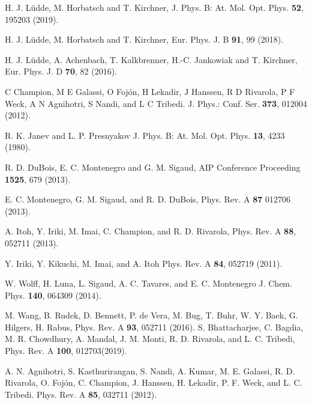\documentclass[10pt,showpacs,showkeys,twocolumn]{revtex4}
\begin{document}
\begin{thebibliography}{}
H. J. L\"udde,  M. Horbatsch and T. Kirchner, J. Phys. B: At. Mol. Opt. Phys.  \textbf{52}, 195203 (2019).

H. J. L\"udde, M. Horbatsch and T. Kirchner, Eur. Phys. J. B \textbf{91}, 99 (2018).

H. J. L\"udde, A. Achenbach, T. Kalkbrenner, H.-C. Jankowiak and T. Kirchner,
Eur. Phys. J. D \textbf{70}, 82 (2016).

C Champion, M E Galassi, O Foj\'{o}n, H Lekadir, J Hanssen, R D Rivarola, P F Weck, A N Agnihotri, S Nandi, and L C Tribedi. 
J. Phys.: Conf. Ser. \textbf{373}, 012004 (2012).


R. K. Janev and L. P. Presnyakov 
J. Phys. B: At. Mol. Opt. Phys.  \textbf{13}, 4233 (1980).

R. D. DuBois, E. C. Montenegro and G. M. Sigaud,
AIP Conference Proceeding \textbf{1525}, 679 (2013).

 E. C. Montenegro, G. M. Sigaud,  and R. D. DuBois, Phys. Rev. A \textbf{87} 012706 (2013).


A. Itoh, Y. Iriki, M. Imai, C. Champion, and R. D. Rivarola, 
Phys. Rev. A \textbf{88}, 052711 (2013).

Y. Iriki, Y. Kikuchi, M. Imai, and A. Itoh
Phys. Rev. A \textbf{84}, 052719 (2011). 


W. Wolff, H. Luna, L. Sigaud, A. C. Tavares, and E. C. Montenegro
J. Chem. Phys. \textbf{140}, 064309 (2014).

M. Wang, B. Rudek, D. Bennett, P. de Vera, M. Bug, T. Buhr, W. Y. Baek, G. Hilgers, H. Rabus, 
Phys. Rev. A \textbf{93}, 052711 (2016). S. Bhattacharjee, C. Bagdia, M. R. Chowdhury, A. Mandal, J. M. Monti, R. D. Rivarola, and L. C. Tribedi, 
Phys. Rev. A \textbf{100}, 012703(2019).

A. N. Agnihotri, S. Kasthurirangan, S. Nandi, A.
Kumar, M. E. Galassi, R. D. Rivarola, O. Foj\'{o}n, C. Champion, J. Hanssen, H. Lekadir, P. F. Weck, and L. C. Tribedi. 
Phys. Rev. A \textbf{85}, 032711 (2012).


\end{thebibliography}
\end{document}
